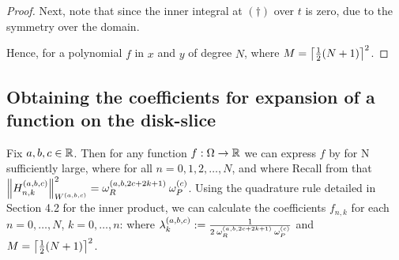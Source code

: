\begin{proof}
Next, note that 
since the inner integral at $(\dagger)$ over $t$ is zero, due to the symmetry over the domain.

Hence, for a polynomial $f$ in $x$ and $y$ of degree $N$,
where $M = \left\lceil\frac{1}{2}(N+1)\right\rceil^2$.
\end{proof}

\subsection{Obtaining the coefficients for expansion of a function on the disk-slice}

Fix $a,b,c \in \mathbb{R}$. Then for any function $f : \Omega \to \mathbb{R}$ we can express $f$ by
for N sufficiently large, where
for all $n = 0,1,2,\dots,N$, and where
Recall from  that $\left\| H_{n,k}^{(a,b,c)} \right\|^2_{W^{(a,b,c)}} = \omega_R^{(a,b,2c+2k+1)} \: \omega_P^{(c)}$. Using the quadrature rule detailed in Section 4.2 for the inner product, we can calculate the coefficients $f_{n,k}$ for each $n = 0,\dots,N$, $k = 0,\dots,n$: 
where $\lambda^{(a,b,c)}_k := {1 \over 2 \: \omega_R^{(a,b,2c+2k+1)} \: \omega_P^{(c)}}$ and $M = \left\lceil\frac{1}{2}(N+1)\right\rceil^2$.


